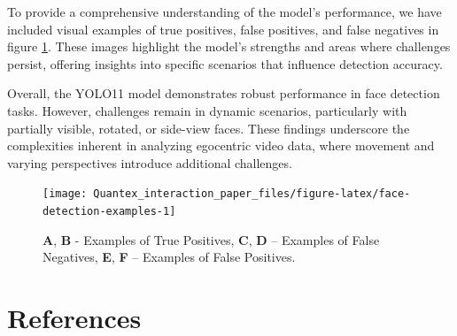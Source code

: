 \documentclass[
  man,floatsintext]{apa6}
\begin{document}
To provide a comprehensive understanding of the model's performance, we have included visual examples of true positives, false positives, and false negatives in figure \ref{fig:face-detection-examples}. These images highlight the model's strengths and areas where challenges persist, offering insights into specific scenarios that influence detection accuracy.

Overall, the YOLO11 model demonstrates robust performance in face detection tasks. However, challenges remain in dynamic scenarios, particularly with partially visible, rotated, or side-view faces. These findings underscore the complexities inherent in analyzing egocentric video data, where movement and varying perspectives introduce additional challenges.

\begin{figure}

{\centering \texttt{[image: Quantex\_interaction\_paper\_files/figure-latex/face-detection-examples-1]} 

}

\caption{\textbf{A}, \textbf{B} - Examples of True Positives, \textbf{C}, \textbf{D} – Examples of False Negatives, \textbf{E}, \textbf{F} – Examples of False Positives.}\label{fig:face-detection-examples}
\end{figure}

\newpage

\section{References}\label{references-1}

\begingroup
\setlength{\parindent}{-0.5in}
\setlength{\leftskip}{0.5in}
\end{document}
